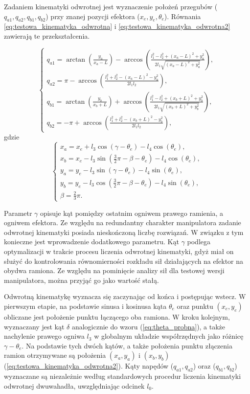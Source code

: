 \documentclass[printmode]{mgr}
\begin{document}
Zadaniem kinematyki odwrotnej jest wyznaczenie położeń przegubów ($q_{a1}, q_{a2}, q_{b1}, q_{b2}$) przy znanej pozycji efektora
($x_e, y_e, \theta_e$). Równania \ref{eq:testowa_kinematyka_odwrotna} i \ref{eq:testowa_kinematyka_odwrotna2} zawierają te przekształcenia.

\begin{equation}
\begin{cases}
q_{a1} = \arctan(\frac{y_a}{x_a-L})-\arccos(\frac{l_1^2-l_2^2+(x_a-L)^2+y_a^2}{2l_1\sqrt{(x_a-L)^2+y_a^2}}),\\
q_{a2} = \pi - \arccos(\frac{l_1^2+l_2^2-(x_a-L)^2-y_a^2}{2l_1l_2}),\\
q_{b1} = \arctan(\frac{y_b}{x_b+L}) + \arccos(\frac{l_1^2-l_2^2+(x_b+L)^2+y_b^2}{2l_1\sqrt{(x_b+L)^2+y_b^2}}),\\
q_{b2} = -\pi + \arccos(\frac{l_1^2+l_2^2-(x_b+L)^2-y_b^2}{2l_1l_2}),
\end{cases}
\label{eq:testowa_kinematyka_odwrotna}
\end{equation}
gdzie
\begin{equation}
\begin{cases}
x_a = x_e + l_3\cos(\gamma - \theta_e) - l_4\cos(\theta_e),\\
x_b = x_e - l_3\sin(\frac{3}{2}\pi - \beta - \theta_e) - l_4\cos(\theta_e),\\
y_a = y_e - l_3\sin(\gamma - \theta_e) - l_4\sin(\theta_e),\\
y_b = y_e - l_3\cos(\frac{3}{2}\pi - \beta - \theta_e) - l_4\sin(\theta_e),\\
\beta = \frac{2}{3}\pi.
\end{cases}
\label{eq:testowa_kinematyka_odwrotna2}
\end{equation}

Parametr $\gamma$ opisuje kąt pomiędzy ostatnim ogniwem prawego ramienia, a ogniwem efektora. Ze względu na redundantny charakter manipulatora
zadanie odwrotnej kinematyki posiada nieskończoną liczbę rozwiązań. W związku z tym konieczne jest wprowadzenie dodatkowego parametru.
Kąt $\gamma$ podlega optymalizacji w trakcie procesu liczenia odwrotnej kinematyki, gdyż miał on służyć do kontrolowania równomierności
rozkładu sił działających na efektor na obydwa ramiona. Ze względu na pominięcie analizy sił dla testowej wersji manipulatora, można
przyjąć go jako wartość stałą.

Odwrotną kinematykę wyznacza się zaczynając od końca i postępując wstecz. W pierwszym etapie, na podstawie sinusa i kosinusa kąta
$\theta_e$ oraz punktu $(x_e, y_e)$ obliczane jest położenie punktu łączącego oba ramiona. W kroku kolejnym, 
wyznaczany jest kąt $\delta$ analogicznie do wzoru (\ref{eq:theta_probna}), a także nachylenie prawego ogniwa $l_3$ w globalnym
układzie współrzędnych jako różnicę $\gamma - \theta_e$. Na podstawie tych dwóch kątów, a także położenia punktu złączenia ramion
otrzymywane są położenia $(x_a, y_a)$ i $(x_b, y_b)$ (\ref{eq:testowa_kinematyka_odwrotna2}). Kąty napędów ($q_{a1}, q_{a2}$) oraz ($q_{b1}, q_{b2}$)
wyznaczane są niezależnie według standardowych procedur liczenia kinematyki odwrotnej dwuwahadła, uwzględniając odcinek $l_0$.
\end{document}
